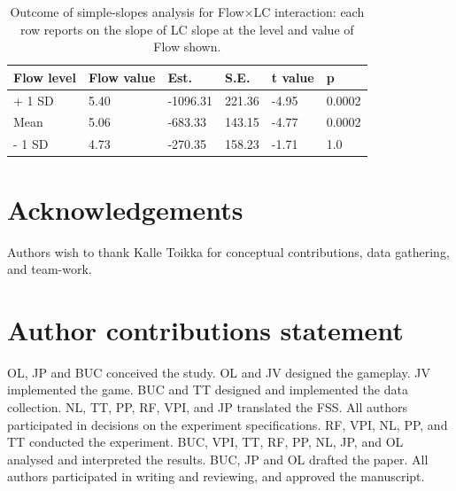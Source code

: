 \documentclass[fleqn,10pt]{wlscirep}
\begin{document}
\begin{table}[ht]
\centering
\caption{\label{tab:simpslopes}Outcome of simple-slopes analysis for Flow$\times$LC interaction: each row reports on the slope of LC slope at the level and value of Flow shown.}
\begin{tabular}{llllll}
\hline
Flow level & Flow value & Est. & S.E. & t value & p \\
\hline
+ 1 SD & 5.40 & -1096.31 & 221.36 & -4.95 & 0.0002 \\
Mean   & 5.06 &  -683.33 & 143.15 & -4.77 & 0.0002 \\
- 1 SD & 4.73 &  -270.35 & 158.23 & -1.71 & 1.0 \\
\hline
\end{tabular}
\end{table}

%





\section*{Acknowledgements}
Authors wish to thank Kalle Toikka for conceptual contributions, data gathering, and team-work.


\section*{Author contributions statement}
OL, JP and BUC conceived the study.
OL and JV designed the gameplay.
JV implemented the game.
BUC and TT designed and implemented the data collection.
NL, TT, PP, RF, VPI, and JP translated the FSS.
All authors participated in decisions on the experiment specifications.
RF, VPI, NL, PP, and TT conducted the experiment.
BUC, VPI, TT, RF, PP, NL, JP, and OL analysed and interpreted the results.
BUC, JP and OL drafted the paper.
All authors participated in writing and reviewing, and approved the manuscript.
\end{document}
